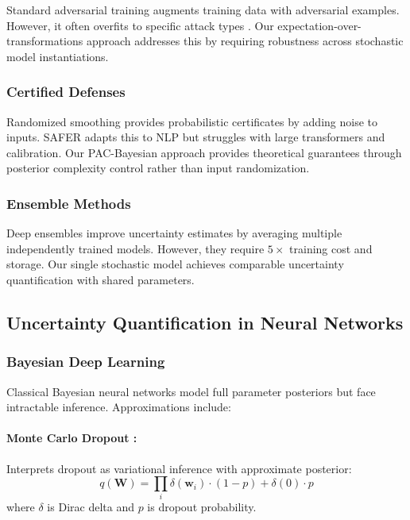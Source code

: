 \documentclass[12pt,a4paper]{article}
\theoremstyle{definition}
\begin{document}
Standard adversarial training \citep{madry2018towards} augments training data with adversarial examples. However, it often overfits to specific attack types \citep{wang2021adversarial}. Our expectation-over-transformations approach addresses this by requiring robustness across stochastic model instantiations.

\subsubsection{Certified Defenses}

Randomized smoothing \citep{cohen2019certified} provides probabilistic certificates by adding noise to inputs. SAFER \citep{ye2020safer} adapts this to NLP but struggles with large transformers and calibration. Our PAC-Bayesian approach provides theoretical guarantees through posterior complexity control rather than input randomization.

\subsubsection{Ensemble Methods}

Deep ensembles \citep{lakshminarayanan2017simple} improve uncertainty estimates by averaging multiple independently trained models. However, they require $5\times$ training cost and storage. Our single stochastic model achieves comparable uncertainty quantification with shared parameters.

\subsection{Uncertainty Quantification in Neural Networks}

\subsubsection{Bayesian Deep Learning}

Classical Bayesian neural networks \citep{abdar2021review} model full parameter posteriors but face intractable inference. Approximations include:

\paragraph{Monte Carlo Dropout \citep{gal2016dropout}:}
Interprets dropout as variational inference with approximate posterior:
\begin{equation}
q(\bm{W}) = \prod_i \delta(\bm{w}_i) \cdot (1-p) + \delta(0) \cdot p
\end{equation}
where $\delta$ is Dirac delta and $p$ is dropout probability.
\end{document}
